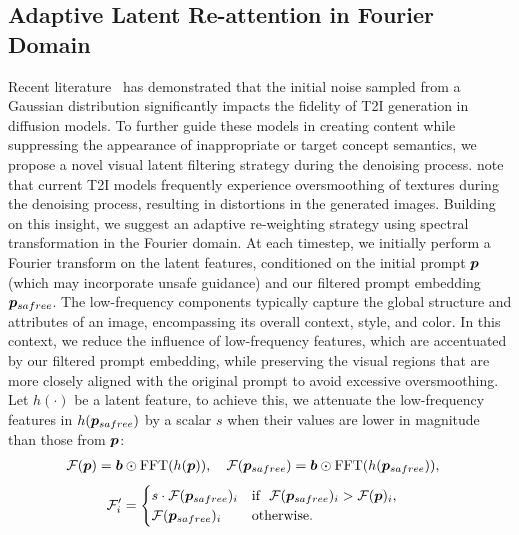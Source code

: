 \subsection{Adaptive Latent Re-attention in Fourier Domain}\label{sec:subsec:latent_attention}
Recent literature~\citep{mao2023guided,qi2024not,ban2024crystal,sun2024spatial} has demonstrated that the initial noise sampled from a Gaussian distribution significantly impacts the fidelity of T2I generation in diffusion models. To further guide these models in creating content while suppressing the appearance of inappropriate or target concept semantics, we propose a novel visual latent filtering strategy during the denoising process. \cite{si2024freeu} note that current T2I models frequently experience oversmoothing of textures during the denoising process, resulting in distortions in the generated images.
Building on this insight, we suggest an adaptive re-weighting strategy using spectral transformation in the Fourier domain. At each timestep, we initially perform a Fourier transform on the latent features, conditioned on the initial prompt $\boldsymbol{p}$ (which may incorporate unsafe guidance) and our filtered prompt embedding $\boldsymbol{p}_{safree}$.
The low-frequency components typically capture the global structure and attributes of an image, encompassing its overall context, style, and color.
In this context, we reduce the influence of low-frequency features, which are accentuated by our filtered prompt embedding, while preserving the visual regions that are more closely aligned with the original prompt to avoid excessive oversmoothing. Let $h(\cdot)$ be a latent feature, to achieve this, we attenuate the low-frequency features in $h(\boldsymbol{p}_{safree})$ by a scalar $s$ when their values are lower in magnitude than those from $\boldsymbol{p}$:
\begin{equation}
\begin{split}\label{eq:fft}
\mathcal{F}({\boldsymbol{p}})&=\boldsymbol{b}\odot\text{FFT}(h(\boldsymbol{p})),~~~\mathcal{F}({\boldsymbol{p}_{safree}})=\boldsymbol{b}\odot\text{FFT}(h(\boldsymbol{p}_{safree})),
\end{split}
\end{equation}
\begin{equation}
\begin{split}\label{eq:fft-select}
\mathcal{F}'_i&=\begin{cases} s \cdot \mathcal{F}({\boldsymbol{p}_{safree}})_i & \text{if}~~ \mathcal{F}({\boldsymbol{p}_{safree}})_i > \mathcal{F}({\boldsymbol{p}})_i,\\
                     \mathcal{F}({\boldsymbol{p}_{safree}})_i &  \text{otherwise}.
       \end{cases}
\end{split}
\end{equation}
